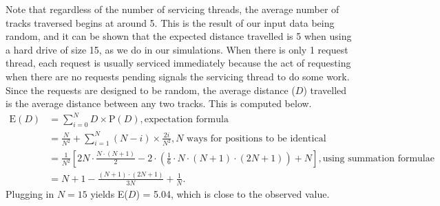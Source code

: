 \documentclass{report}
\newcommand{\dsum}{\displaystyle\sum}
\begin{document}
Note that regardless of the number of servicing threads, the average number of tracks
traversed begins at around 5. This is the result of our input data being random, and it
can be shown that the expected distance travelled is 5 when using a hard drive of size 15,
as we do in our simulations. When there is only 1 request thread, each request is usually
serviced immediately because the act of requesting when there are no requests pending
signals the servicing thread to do some work. Since the requests are designed to be
random, the average distance ($D$) travelled is the average distance between any two
tracks. This is computed below.
\begin{align*}
\mathrm{E}(D) &= \dsum_{i=0}^N D\times\mathrm{P}(D),\text{expectation formula}\\
              &= \frac{N}{N^2} + \dsum_{i=1}^N (N - i)\times \frac{2i}{N^2},\text{$N$ ways for
                                                      positions to be identical} \\
              &= \frac{1}{N^2}\left[ 2N\cdot\frac{N\cdot(N+1)}{2} 
              - 2\cdot\left(\frac{1}{6}\cdot N \cdot (N+1) \cdot (2N + 1) \right)
              + N \right], \text{using summation formulae}\\
              &= N+1 - \frac{(N+1)\cdot(2N + 1)}{3N} + \frac{1}{N}.
\end{align*}
Plugging in $N = 15$ yields E($D$) = 5.04, which is close to the observed value.
%
%
%
\end{document}
